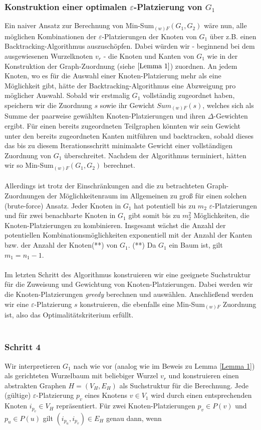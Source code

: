 \documentclass[a4paper, 12pt, twoside]{article}
\theoremstyle{Format1} %
\begin{document}
\subsubsection{Konstruktion einer optimalen $\varepsilon$-Platzierung von $G_1$}
Ein naiver Ansatz zur Berechnung von Min-Sum$_{(w)F}(G_1,G_2)$ wäre nun, alle möglichen Kombinationen der $\varepsilon$-Platzierungen der Knoten von $G_1$ über z.B. einen Backtracking-Algorithmus auszuschöpfen.
Dabei würden wir - beginnend bei dem ausgewiesenen Wurzelknoten $v_r$ - die Knoten und Kanten von $G_1$ wie in der Konstruktion der Graph-Zuordnung (siehe $\ref{Lemma 1}$) zuordnen.
An jedem Knoten, wo es für die Auswahl einer Knoten-Platzierung mehr als eine Möglichkeit gibt, hätte der Backtracking-Algorithmus eine Abzweigung pro möglicher Auswahl.
Sobald wir erstmalig $G_1$ vollständig zugeordnet haben, speichern wir die Zuordnung $s$ sowie ihr Gewicht $Sum_{(w)F}(s)$, welches sich als Summe der
paarweise gewählten Knoten-Platzierungen und ihren $\Delta$-Gewichten ergibt.
Für einen bereits zugeordneten Teilgraphen könnten wir sein Gewicht unter den bereits zugeordneten Kanten mitführen und backtracken, sobald dieses das bis zu diesem Iterationsschritt
minimalste Gewicht einer vollständigen Zuordnung von $G_1$ überschreitet. Nachdem der Algorithmus terminiert, hätten wir so Min-Sum$_{(w)F}(G_1,G_2)$ berechnet.
\\
\\
Allerdings ist trotz der Einschränkungen and die zu betrachteten Graph-Zuordnungen der Möglichkeitenraum im Allgemeinen zu groß
für einen solchen (brute-force) Ansatz.
Jeder Knoten in $G_1$ hat potentiell bis zu $m_2$ $\varepsilon$-Platzierungen und für
zwei benachbarte Knoten in $G_1$ gibt somit bis zu $m_2^2$ Möglichkeiten, die Knoten-Platzierungen zu kombinieren.
Insgesamt wächst die Anzahl der potentiellen Kombinationsmöglichkeiten exponentiell mit der Anzahl der Kanten bzw. der Anzahl der Knoten(**) von $G_1$.
(**) Da $G_1$ ein Baum ist, gilt $m_1 = n_1-1$.
\\
\\
Im letzten Schritt des Algorithmus konstruieren wir eine geeignete Suchstruktur für die Zuweisung und Gewichtung von Knoten-Platzierungen.
Dabei werden wir die Knoten-Platzierungen \textit{greedy} berechnen und auswählen.
Anschließend werden wir eine $\varepsilon$-Platzierung $s$ konstruieren, die ebenfalls eine Min-Sum$_{(w)F}$ Zuordnung ist, also das Optimalitätskriterium erfüllt.
\\
\\
\subsubsection{Schritt 4}
Wir interpretieren $G_1$ nach wie vor (analog wie im Beweis zu Lemma \ref{Lemma 1}) als gerichteten Wurzelbaum  mit beliebiger Wurzel $v_r$ und
konstruieren einen abstrakten Graphen $H = (V_H, E_H)$ als Suchstruktur für die Berechnung.
Jede (gültige) $\varepsilon$-Platzierung $p_v$ eines Knotens $v \in V_1$ wird durch einen entsprechenden Knoten $i_{p_v} \in V_H$ repräsentiert.
Für zwei Knoten-Platzierungen $p_v \in P(v)$ und $p_u \in P(u)$ gilt $(i_{p_u},i_{p_v}) \in E_H$ genau dann, wenn
\end{document}
